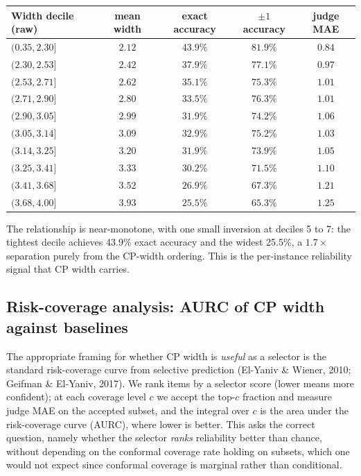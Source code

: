 \documentclass[11pt]{article}
\begin{document}
\begin{center}
\small
\begin{tabular}{lcccc}
\toprule
\textbf{Width decile (raw)} & \textbf{mean width} & \textbf{exact accuracy} & $\pm 1$ \textbf{accuracy} & \textbf{judge MAE} \\
\midrule
$(0.35, 2.30]$ & $2.12$ & $43.9\%$ & $81.9\%$ & $0.84$ \\
$(2.30, 2.53]$ & $2.42$ & $37.9\%$ & $77.1\%$ & $0.97$ \\
$(2.53, 2.71]$ & $2.62$ & $35.1\%$ & $75.3\%$ & $1.01$ \\
$(2.71, 2.90]$ & $2.80$ & $33.5\%$ & $76.3\%$ & $1.01$ \\
$(2.90, 3.05]$ & $2.99$ & $31.9\%$ & $74.2\%$ & $1.06$ \\
$(3.05, 3.14]$ & $3.09$ & $32.9\%$ & $75.2\%$ & $1.03$ \\
$(3.14, 3.25]$ & $3.20$ & $31.9\%$ & $73.9\%$ & $1.05$ \\
$(3.25, 3.41]$ & $3.33$ & $30.2\%$ & $71.5\%$ & $1.10$ \\
$(3.41, 3.68]$ & $3.52$ & $26.9\%$ & $67.3\%$ & $1.21$ \\
$(3.68, 4.00]$ & $3.93$ & $25.5\%$ & $65.3\%$ & $1.25$ \\
\bottomrule
\end{tabular}
\end{center}

The relationship is near-monotone, with one small inversion at deciles 5 to 7: the tightest decile achieves 43.9\% exact accuracy and the widest 25.5\%, a $1.7\times$ separation purely from the CP-width ordering. This is the per-instance reliability signal that CP width carries.

\subsection*{Risk-coverage analysis: AURC of CP width against baselines}

The appropriate framing for whether CP width is \emph{useful} as a selector is the standard risk-coverage curve from selective prediction (El-Yaniv \& Wiener, 2010; Geifman \& El-Yaniv, 2017). We rank items by a selector score (lower means more confident); at each coverage level $c$ we accept the top-$c$ fraction and measure judge MAE on the accepted subset, and the integral over $c$ is the area under the risk-coverage curve (AURC), where lower is better. This asks the correct question, namely whether the selector \emph{ranks} reliability better than chance, without depending on the conformal coverage rate holding on subsets, which one would not expect since conformal coverage is marginal rather than conditional.
\end{document}
